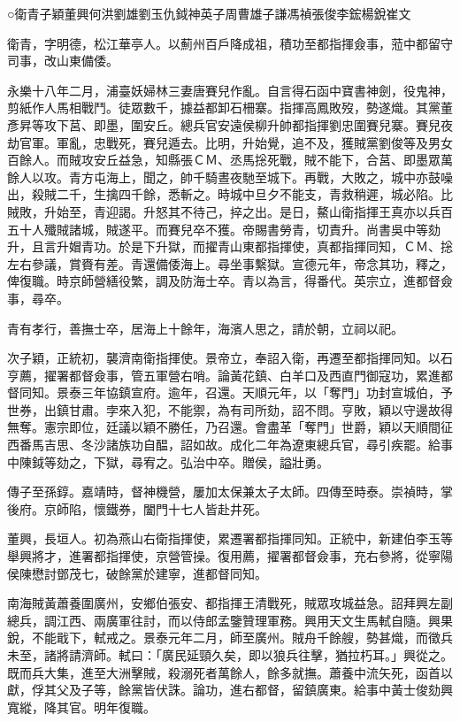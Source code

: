 
\begin{pinyinscope}
○衛青子穎董興何洪劉雄劉玉仇鉞神英子周曹雄子謙馮禎張俊李鋐楊銳崔文

衛青，字明德，松江華亭人。以薊州百戶降成祖，積功至都指揮僉事，蒞中都留守司事，改山東備倭。

永樂十八年二月，浦臺妖婦林三妻唐賽兒作亂。自言得石函中寶書神劍，役鬼神，剪紙作人馬相戰鬥。徒眾數千，據益都卸石柵寨。指揮高鳳敗歿，勢遂熾。其黨董彥昇等攻下莒、即墨，圍安丘。總兵官安遠侯柳升帥都指揮劉忠圍賽兒寨。賽兒夜劫官軍。軍亂，忠戰死，賽兒遁去。比明，升始覺，追不及，獲賊黨劉俊等及男女百餘人。而賊攻安丘益急，知縣張ＣＭ、丞馬捴死戰，賊不能下，合莒、即墨眾萬餘人以攻。青方屯海上，聞之，帥千騎晝夜馳至城下。再戰，大敗之，城中亦鼓噪出，殺賊二千，生擒四千餘，悉斬之。時城中旦夕不能支，青救稍遲，城必陷。比賊敗，升始至，青迎謁。升怒其不待己，捽之出。是日，鰲山衛指揮王真亦以兵百五十人殲賊諸城，賊遂平。而賽兒卒不獲。帝賜書勞青，切責升。尚書吳中等劾升，且言升媢青功。於是下升獄，而擢青山東都指揮使，真都指揮同知，ＣＭ、捴左右參議，賞賚有差。青還備倭海上。尋坐事繫獄。宣德元年，帝念其功，釋之，俾復職。時京師營繕役繁，調及防海士卒。青以為言，得番代。英宗立，進都督僉事，尋卒。

青有孝行，善撫士卒，居海上十餘年，海濱人思之，請於朝，立祠以祀。

次子穎，正統初，襲濟南衛指揮使。景帝立，奉詔入衛，再遷至都指揮同知。以石亨薦，擢署都督僉事，管五軍營右哨。論黃花鎮、白羊口及西直門御寇功，累進都督同知。景泰三年協鎮宣府。逾年，召還。天順元年，以「奪門」功封宣城伯，予世券，出鎮甘肅。孛來入犯，不能禦，為有司所劾，詔不問。亨敗，穎以守邊故得無奪。憲宗即位，廷議以穎不勝任，乃召還。會盡革「奪門」世爵，穎以天順間征西番馬吉思、冬沙諸族功自醖，詔如故。成化二年為遼東總兵官，尋引疾罷。給事中陳鉞等劾之，下獄，尋宥之。弘治中卒。贈侯，謚壯勇。

傳子至孫錞。嘉靖時，督神機營，屢加太保兼太子太師。四傳至時泰。崇禎時，掌後府。京師陷，懷鐵券，闔門十七人皆赴井死。

董興，長垣人。初為燕山右衛指揮使，累遷署都指揮同知。正統中，新建伯李玉等舉興將才，進署都指揮使，京營管操。復用薦，擢署都督僉事，充右參將，從寧陽侯陳懋討鄧茂七，破餘黨於建寧，進都督同知。

南海賊黃蕭養圍廣州，安鄉伯張安、都指揮王清戰死，賊眾攻城益急。詔拜興左副總兵，調江西、兩廣軍往討，而以侍郎孟鑒贊理軍務。興用天文生馬軾自隨。興果銳，不能戢下，軾戒之。景泰元年二月，師至廣州。賊舟千餘艘，勢甚熾，而徵兵未至，諸將請濟師。軾曰：「廣民延頸久矣，即以狼兵往擊，猶拉朽耳。」興從之。既而兵大集，進至大洲擊賊，殺溺死者萬餘人，餘多就撫。蕭養中流矢死，函首以獻，俘其父及子等，餘黨皆伏誅。論功，進右都督，留鎮廣東。給事中黃士俊劾興寬縱，降其官。明年復職。


\end{pinyinscope}
